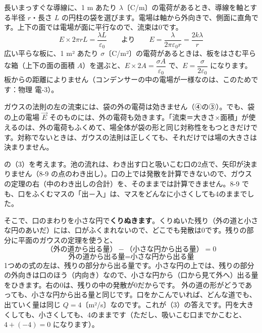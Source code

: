 長いまっすぐな導線に、1 m あたり $\lambda$〔C/m〕の電荷があるとき、導線を軸とする半径 $r$・長さ $L$ の円柱の袋を選びます。電場は軸から外向きで、側面に直角です。上下の面では電場が面に平行なので、流束は0です。
\[ E\times2\pi rL=\frac{\lambda L}{\varepsilon_0}\qquad\text{より}\qquad E=\frac{\lambda}{2\pi\varepsilon_0r}=\frac{2k\lambda}{r} \]
広い平らな板に、1 m² あたり $\sigma$〔C/m²〕の電荷があるときは、板をはさむ平らな箱（上下の面の面積 $A$）を選ぶと、$E\times2A=\dfrac{\sigma A}{\varepsilon_0}$ で、$E=\dfrac{\sigma}{2\varepsilon_0}$ になります。板からの距離によりません（コンデンサーの中の電場が一様なのは、このためです：物理 電-3）。

\begin{seikaku}
ガウスの法則の左の流束には、袋の外の電荷は効きません（④の③）。でも、袋の上の電場 $\vec E$ そのものには、外の電荷も効きます。「流束＝大きさ×面積」が使えるのは、外の電荷もふくめて、場全体が袋の形と同じ対称性をもつときだけです。対称でないときは、ガウスの法則は正しくても、それだけでは場の大きさは決まりません。
\end{seikaku}


\leavevmode\label{bk:8-11:kurinuku}\bkhatenaref の（3）を考えます。池の流れは、わき出す口と吸いこむ口の2点で、矢印が決まりません（8-9 の点のわき出し）。口の上では発散を計算できないので、ガウスの定理の右（中のわき出しの合計）を、そのままでは計算できません。8-9 でも、口をふくむマスの「出－入」は、マスをどんなに小さくしても4のままでした。

\noindent そこで、口のまわりを小さな円で\textbf{くりぬきます}。くりぬいた残り（外の道と小さな円のあいだ）には、口がふくまれないので、どこでも発散は0です。残りの部分に平面のガウスの定理を使うと、
\[ （\text{外の道から出る量}）-（\text{小さな円から出る量}）=0 \]
\[ \text{外の道から出る量}=\text{小さな円から出る量} \]
1つめの式の左は、残りの部分から出る量です。小さな円の上では、残りの部分の外向きは口のほう（内向き）なので、小さな円から（口から見て外へ）出る量をひきます。右の0は、残りの中の発散が0だからです。
外の道の形がどうであっても、小さな円から出る量と同じです。口をかこんでいれば、どんな道でも、出ていく量は同じ $Q=4$〔m²/s〕なのです。これが（3）の答えです。円を大きくしても、小さくしても、4のままです（ただし、吸いこむ口までかこむと、$4+(-4)=0$ になります）。

